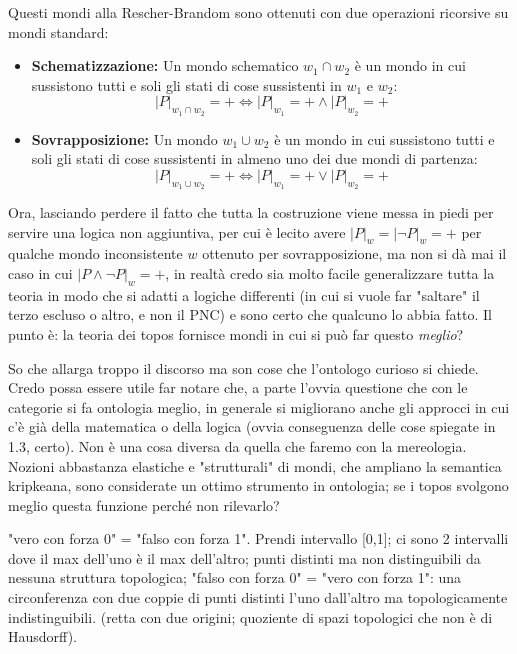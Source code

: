 \documentclass[a4paper, 11pt]{article}
\begin{document}
Questi mondi alla Rescher-Brandom sono ottenuti con due operazioni ricorsive su mondi standard:
\begin{itemize}
	\item \textbf{Schematizzazione:} Un mondo schematico $w_1 \cap w_2$ è un mondo in cui sussistono tutti e soli gli stati di cose sussistenti in $w_1$ e $w_2$:
	\[ |P|_{w_1 \cap w_2} = + \iff |P|_{w_1} = + \land |P|_{w_2} = + \]
	
	\item \textbf{Sovrapposizione:} Un mondo $w_1 \cup w_2$ è un mondo in cui sussistono tutti e soli gli stati di cose sussistenti in almeno uno dei due mondi di partenza:
	\[ |P|_{w_1 \cup w_2} = + \iff |P|_{w_1} = + \lor |P|_{w_2} = +\]
\end{itemize}     

Ora, lasciando perdere il fatto che tutta la costruzione viene messa in piedi per servire una logica non aggiuntiva, per cui è lecito avere $|P|_w = |\neg P|_w = +$ per qualche mondo inconsistente $w$ ottenuto per sovrapposizione, ma non si dà mai il caso in cui $|P \land \neg P|_w = +$, in realtà credo sia molto facile generalizzare tutta la teoria in modo che si adatti a logiche differenti (in cui si vuole far "saltare" il terzo escluso o altro, e non il PNC) e sono certo che qualcuno lo abbia fatto. Il punto è: la teoria dei topos fornisce mondi in cui si può far questo \emph{meglio}?

So che allarga troppo il discorso ma son cose che l'ontologo curioso si chiede. Credo possa essere utile far notare che, a parte l'ovvia questione che con le categorie si fa ontologia meglio, in generale si migliorano anche gli approcci in cui c'è già della matematica o della logica (ovvia conseguenza delle cose spiegate in 1.3, certo). Non è una cosa diversa da quella che faremo con la mereologia. Nozioni abbastanza elastiche e "strutturali" di mondi, che ampliano la semantica kripkeana, sono considerate un ottimo strumento in ontologia; se i topos svolgono meglio questa funzione perché non rilevarlo? 


"vero con forza 0" = "falso con forza 1". Prendi intervallo [0,1]; ci sono 2 intervalli dove il max dell'uno è il max dell'altro; punti distinti ma non distinguibili da nessuna struttura topologica; "falso con forza 0" = "vero con forza 1": una circonferenza con due coppie di punti distinti l'uno dall'altro ma topologicamente indistinguibili.   
(retta con due origini; quoziente di spazi topologici che non è di Hausdorff).

 
\end{document}
